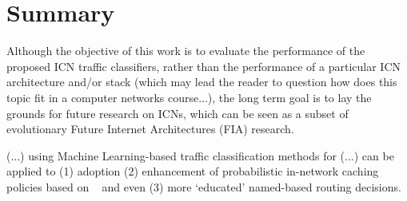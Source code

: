 \section{Summary}
\label{sec:summ}

Although the objective of this work is to evaluate the performance of the 
proposed ICN traffic classifiers, rather than the performance of a particular 
ICN architecture and\slash or stack (which may lead the reader to question how 
does this topic fit in a computer networks course...), the long term goal is to 
lay the grounds for future research on ICNs, which can be seen as a subset of 
evolutionary Future Internet Architectures (FIA) research.\vertbreak

(...) using Machine Learning-based traffic classification 
methods for (...) can be applied to (1) adoption (2) enhancement of probabilistic in-network caching 
policies based on ~\cite{Psaras2012,Chai2013} and even (3) more `educated' named-based 
routing decisions.

